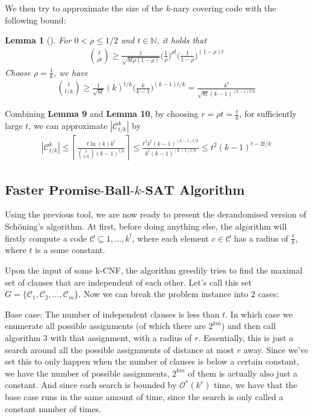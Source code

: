 \documentclass[a4paper,12pts]{article}
\newcommand{\SATbf}{\textbf{$k$-SAT}}
\newcommand{\PBSbf}{\textbf{Promise-Ball-$\SATbf$}}
\newcommand{\cc}{\mathcal{C}}
\renewcommand{\O}{\mathcal{O}^*}
\newtheorem{lemma}{Lemma}
\begin{document}
We then try to approximate the size of the $k$-nary covering code with the following bound:
\begin{lemma}[\cite{MacWilliams77}]
	For $0<\rho \le 1/2$ and $t \in \mathbb{N}$, it holds that
	\begin{align*}
	{t \choose \rho t}\geq \frac{1}{\sqrt{8t\rho(1-\rho)}}\Big(\frac{1}{\rho}\Big)^{\rho t}\Big(\frac{1}{1-\rho}\Big)^{(1-\rho) t}
	\end{align*} 
	Choose $\rho = \frac{1}{k}$, we have
	\begin{align*}
	{t \choose t/k}\geq \frac{1}{\sqrt{8t}}(k)^{t/k}\Big(\frac{k}{k-1}\Big)^{(k-1) t/k} = \frac{k^t}{\sqrt{8t}(k-1)^{(k-1)t/k}}
	\end{align*} 
\end{lemma}
	Combining \textbf{Lemma 9} and \textbf{Lemma 10}, by choosing $r = \rho t = \frac{t}{k}$, for sufficiently large $t$, we can approximate $|\cc^k_{t/k}|$ by
\begin{align*}
|\cc^k_{{t/k}}| \leq \left \lceil \frac{t\ln(k)k^t}{{t \choose t/k}(k-1)^{t/k}} \right \rceil \leq \frac{t^2 k^t (k-1)^{(k-1)t/k}}{k^t(k-1)^{(k-1)t/k}} \leq t^2(k-1)^{t-2t/k}
\end{align*}
\subsection{Faster $\PBSbf$ Algorithm}
Using the previous tool, we are now ready to present the derandomised version of Sch\"{o}ning's algorithm. At first, before doing anything else, the algorithm will firstly compute a code $\mathcal{C} \subseteq {1, ...,k}^t$, where each element $c \in \mathcal{C}$ has a radius of $\frac{t}{k}$, where $t$ is a some constant.\par

Upon the input of some k-CNF, the algorithm greedily tries to find the maximal set of clauses that are independent of each other. Let's call this set $G = \{\mathcal{C}_1, \mathcal{C}_2, ...,\mathcal{C}_m\}$. Now we can break the problem instance into 2 cases: \par

Base case: The number of independent clauses is less than $t$. In which case we enumerate all possible assignments (of which there are $2^{km}$) and then call algorithm 3 with that assignment, with a radius of $r$. Essentially, this is just a search around all the possible assignments of distance at most $r$ away. Since we've set this to only happen when the number of clauses is below a certain constant, we have the number of possible assignments, $2^{km}$ of them is actually also just a constant. And since each search is bounded by $\O(k^r)$ time, we have that the base case runs in the same amount of time, since the search is only called a constant number of times.\par
\end{document}
